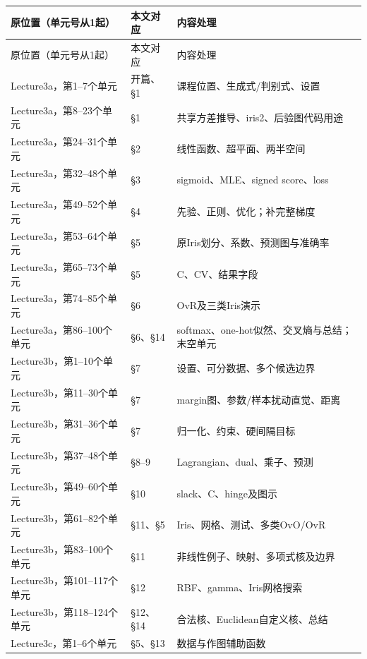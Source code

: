 \begingroup
\small\setlength{\tabcolsep}{3pt}
\renewcommand{\arraystretch}{1.22}
\begin{longtable}{@{}>{\raggedright\arraybackslash}p{}>{\raggedright\arraybackslash}p{}>{\raggedright\arraybackslash}p{}@{}}
\toprule
原位置（单元号从1起） & 本文对应 & 内容处理 \\
\midrule\endfirsthead
原位置（单元号从1起） & 本文对应 & 内容处理 \\
\midrule\endhead
\bottomrule\endfoot
Lecture3a，第1–7个单元 & 开篇、§1 & 课程位置、生成式/判别式、设置 \\
Lecture3a，第8–23个单元 & §1 & 共享方差推导、iris2、后验图代码用途 \\
Lecture3a，第24–31个单元 & §2 & 线性函数、超平面、两半空间 \\
Lecture3a，第32–48个单元 & §3 & sigmoid、MLE、signed score、loss \\
Lecture3a，第49–52个单元 & §4 & 先验、正则、优化；补完整梯度 \\
Lecture3a，第53–64个单元 & §5 & 原Iris划分、系数、预测图与准确率 \\
Lecture3a，第65–73个单元 & §5 & C、CV、结果字段 \\
Lecture3a，第74–85个单元 & §6 & OvR及三类Iris演示 \\
Lecture3a，第86–100个单元 & §6、§14 & softmax、one-hot似然、交叉熵与总结；末空单元 \\
Lecture3b，第1–10个单元 & §7 & 设置、可分数据、多个候选边界 \\
Lecture3b，第11–30个单元 & §7 & margin图、参数/样本扰动直觉、距离 \\
Lecture3b，第31–36个单元 & §7 & 归一化、约束、硬间隔目标 \\
Lecture3b，第37–48个单元 & §8–9 & Lagrangian、dual、乘子、预测 \\
Lecture3b，第49–60个单元 & §10 & slack、C、hinge及图示 \\
Lecture3b，第61–82个单元 & §11、§5 & Iris、网格、测试、多类OvO/OvR \\
Lecture3b，第83–100个单元 & §11 & 非线性例子、映射、多项式核及边界 \\
Lecture3b，第101–117个单元 & §12 & RBF、gamma、Iris网格搜索 \\
Lecture3b，第118–124个单元 & §12、§14 & 合法核、Euclidean自定义核、总结 \\
Lecture3c，第1–6个单元 & §5、§13 & 数据与作图辅助函数 \\

\end{longtable}
